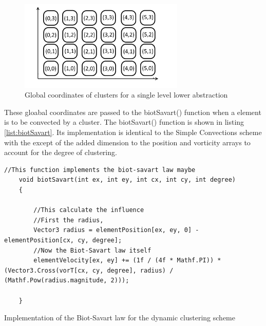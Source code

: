 \begin{figure}[H]
\centering
\includegraphics[width=0.7\textwidth]{Figures/AbstractionGridExample4.png}
\caption{\label{fig:GridNomenclature4} Global coordinates of clusters for a single level lower abstraction}
\end{figure} 

These gloabal coordinates are passed to the biotSavart() function when a element is to be convected by a cluster. The biotSavart() function is shown in listing \ref{list:biotSavart}. Its implementation is identical to the Simple Convections scheme with the except of the added dimension to the position and vorticity arrays to account for the degree of clustering.

\begin{listing}[H]
\begin{verbatim}
//This function implements the biot-savart law maybe
    void biotSavart(int ex, int ey, int cx, int cy, int degree)
    {

        //This calculate the influence
        //First the radius,
        Vector3 radius = elementPosition[ex, ey, 0] - elementPosition[cx, cy, degree];
        //Now the Biot-Savart law itself
        elementVelocity[ex, ey] += (1f / (4f * Mathf.PI)) * (Vector3.Cross(vorT[cx, cy, degree], radius) / (Mathf.Pow(radius.magnitude, 2)));

    }
\end{verbatim}
\caption{Implementation of the Biot-Savart law for the dynamic clustering scheme}
\label{list:biotSavart}
\end{listing}